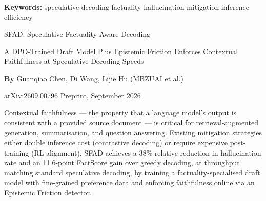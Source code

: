\documentclass[10pt,twocolumn]{article}
\begin{document}
\setlength{\parindent}{0pt}
\setlength{\parskip}{4pt}

{\small\color{keywordgray}\textbf{Keywords:}
  speculative decoding \textbullet{}
  factuality \textbullet{}
  hallucination mitigation \textbullet{}
  inference efficiency}\par\vspace{4pt}

{\LARGE\bfseries\raggedright
  SFAD: Speculative Factuality-Aware Decoding}\par\vspace{4pt}

{\large\itshape\raggedright
  A DPO-Trained Draft Model Plus Epistemic
  Friction Enforces Contextual Faithfulness at
  Speculative Decoding Speeds}\par\vspace{6pt}

{\small\textbf{By} Guanqiao Chen, Di Wang, Lijie Hu
  (MBZUAI et al.)}\par\vspace{2pt}

{\small\color{keywordgray}arXiv:2609.00796 \textbullet{} Preprint, September 2026}
\par\vspace{2pt}\noindent{\color{rulered}\rule{\columnwidth}{0.6pt}}\vspace{6pt}

Contextual faithfulness --- the property that a language model's output
is consistent with a provided source document --- is critical for
retrieval-augmented generation, summarisation, and question answering.
Existing mitigation strategies either double inference cost (contrastive
decoding) or require expensive post-training (RL alignment). SFAD
achieves a 38\% relative reduction in hallucination rate and an 11.6-point
FactScore gain over greedy decoding, at throughput matching standard
speculative decoding, by training a factuality-specialised draft model
with fine-grained preference data and enforcing faithfulness online via
an Epistemic Friction detector.
\end{document}
